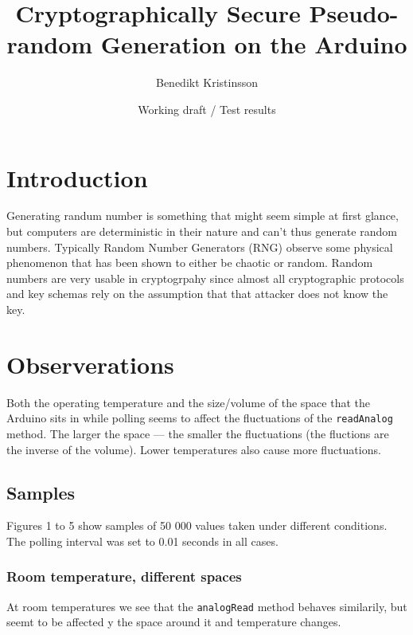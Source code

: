 \documentclass[10pt,a4paper]{article}
\author{Benedikt Kristinsson}
\title{Cryptographically Secure Pseudo-random Generation on the Arduino}
\date{Working draft / Test results}
\begin{document}
\maketitle

\section{Introduction}

Generating randum number is something that might seem simple at first glance, but computers are deterministic in their nature and can't thus generate random numbers. Typically Random Number Generators (RNG) observe some physical phenomenon that has been shown to either be chaotic or random. Random numbers are very usable in cryptogrpahy since almost all cryptographic protocols and key schemas rely on the assumption that that attacker does not know the key. 

\section{Observerations}

Both the operating temperature and the size/volume of the space that the Arduino sits in while polling seems to affect the fluctuations of the \texttt{readAnalog} method. The larger the space --- the smaller the fluctuations (the fluctions are the inverse of the volume). Lower temperatures also cause more fluctuations.


\subsection{Samples}

 Figures 1 to 5 show samples of 50 000 values taken under different conditions. The polling interval was set to 0.01 seconds in all cases. 

\subsubsection{Room temperature, different spaces}

At room temperatures we see that the \texttt{analogRead} method behaves similarily, but seemt to be affected y the space around it and temperature changes. 
\end{document}
